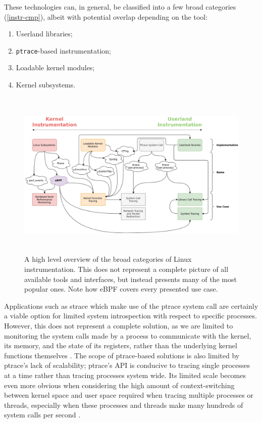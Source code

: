 \documentclass[
  12pt]{findlay}
\newcommand{\passthrough}[1]{#1}
\providecommand{\tightlist}{\setlength{\itemsep}{0pt}\setlength{\parskip}{0pt}}
\begin{document}
\clearpage

These technologies can, in general, be classified into a few broad
categories (\autoref{instr-cmp}), albeit with potential overlap
depending on the tool:

\begin{enumerate}
\def\labelenumi{\arabic{enumi})}
\tightlist
\item
  Userland libraries;
\item
  \passthrough{\lstinline!ptrace!}-based instrumentation;
\item
  Loadable kernel modules;
\item
  Kernel subsystems.
\end{enumerate}

\begin{figure}
\begin{center}
\includegraphics[keepaspectratio, height=3.2in]{../figures/instr-cmp.png}
\end{center}
\caption[A high level overview of the broad categories of Linux instrumentation]{
A high level overview of the broad categories of Linux instrumentation.
This does not represent a complete picture of all available tools and interfaces,
but instead presents many of the most popular ones. Note how eBPF covers every presented use case.
}
\label{instr-cmp}
\end{figure}

Applications such as strace \autocite{strace,manstrace} which make use
of the ptrace system call are certainly a viable option for limited
system introspection with respect to specific processes. However, this
does not represent a complete solution, as we are limited to monitoring
the system calls made by a process to communicate with the kernel, its
memory, and the state of its registers, rather than the underlying
kernel functions themselves \autocite{manptrace}. The scope of
ptrace-based solutions is also limited by ptrace's lack of scalability;
ptrace's API is conducive to tracing single processes at a time rather
than tracing processes system wide. Its limited scale becomes even more
obvious when considering the high amount of context-switching between
kernel space and user space required when tracing multiple processes or
threads, especially when these processes and threads make many hundreds
of system calls per second \autocite{keniston07}.
\end{document}
